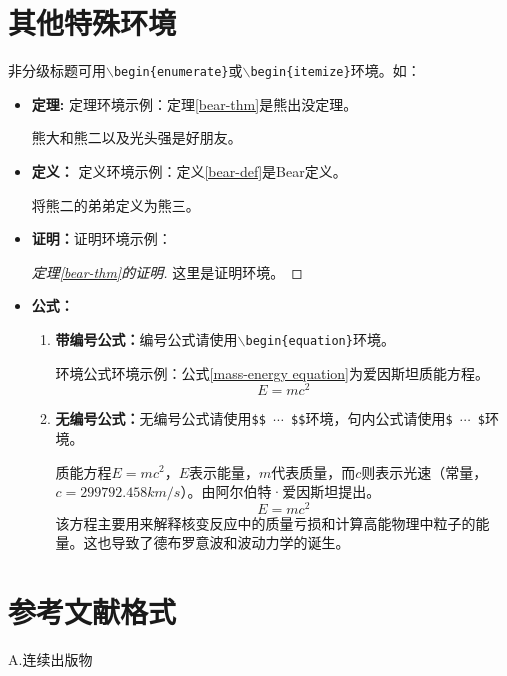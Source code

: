 \section{其他特殊环境}
	非分级标题可用\texttt{$\backslash$begin\{enumerate\}}或\texttt{$\backslash$begin\{itemize\}}环境。如：
	
	\begin{itemize}
		\item \textbf{定理:} 定理环境示例：定理\ref{bear-thm}是熊出没定理。
		\begin{theorem}[熊出没定理]\label{bear-thm}
			熊大和熊二以及光头强是好朋友。
		\end{theorem}
		\item \textbf{定义：} 定义环境示例：定义\ref{bear-def}是Bear定义。
		\begin{definition}[Bear定义]\label{bear-def}
			将熊二的弟弟定义为熊三。
		\end{definition}
		\item \textbf{证明：}证明环境示例：
		\begin{proof}[定理\ref{bear-thm}的证明]
			这里是证明环境。
		\end{proof}
		\item \textbf{公式：}
		\begin{enumerate}
			\item \textbf{带编号公式：}编号公式请使用\texttt{$\backslash$begin\{equation\}}环境。
			
			环境公式环境示例：公式\ref{mass-energy equation}为爱因斯坦质能方程。
			\begin{equation}\label{mass-energy equation}
			E=mc^{2}
			\end{equation}
		
			\item \textbf{无编号公式：}无编号公式请使用\texttt{\$\$ $\cdots$ \$\$}环境，句内公式请使用\texttt{\$ $\cdots$ \$}环境。
			
			质能方程$E=mc^{2}$，$E$表示能量，$m$代表质量，而$c$则表示光速（常量，$c=299792.458km/s$）。由阿尔伯特·爱因斯坦提出。$$E=mc^{2}$$该方程主要用来解释核变反应中的质量亏损和计算高能物理中粒子的能量。这也导致了德布罗意波和波动力学的诞生。
		\end{enumerate}
	\end{itemize}

\section{参考文献格式}

\noindent A.连续出版物

